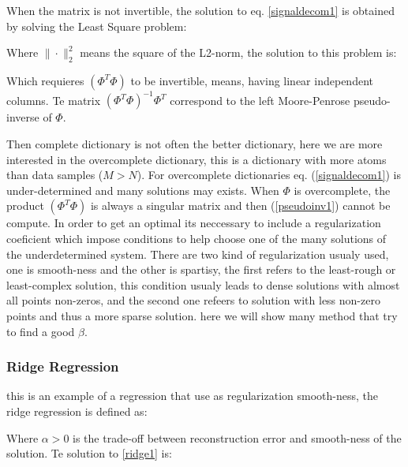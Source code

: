 
\newp When the matrix is not invertible, the solution to eq. \ref{signaldecom1} is obtained by solving the  Least Square problem:


\newp Where $\| \cdotp \|_{2}^{2}$ means the square of the L2-norm, the solution to this problem is:


\newp Which requieres $(\Phi^{T}\Phi)$ to be invertible, means, having linear independent columns. Te matrix $(\Phi^{T}\Phi)^{-1}\Phi^{T}$ correspond to the left Moore-Penrose pseudo-inverse of $\Phi$.

\newp Then complete dictionary is not often the better dictionary, here we are more interested in the overcomplete dictionary, this is a dictionary with more atoms than data samples ($M > N$). For overcomplete dictionaries eq. (\ref{signaldecom1}) is under-determined and many solutions may exists. When $\Phi$ is overcomplete, the product $(\Phi^{T}\Phi)$ is always a singular matrix and then (\ref{pseudoinv1}) cannot be compute. In order to get an optimal its neccessary to include a regularization coeficient which impose conditions to help choose one of the many solutions of the underdetermined system. There are two kind of regularization usualy used, one is smooth-ness and the other is spartisy, the first refers to the least-rough or least-complex solution, this condition usualy leads to dense solutions with almost all points non-zeros, and the second one refeers to solution with less non-zero points and thus a more sparse solution. here we will show many method that try to find a good $\beta$.

\subsubsection{Ridge Regression}
\newp this is an example of a regression that use as regularization smooth-ness, the ridge regression is defined as:


\newp Where $\alpha > 0$ is the trade-off between reconstruction error and smooth-ness of the solution. Te solution to \ref{ridge1} is:

